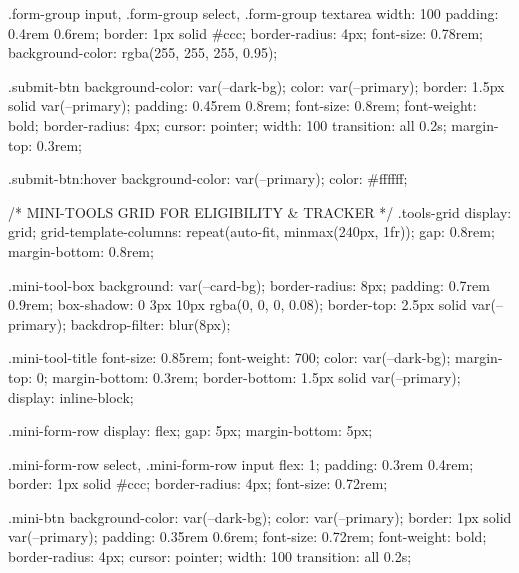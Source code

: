         .form-group input,
        .form-group select,
        .form-group textarea {
            width: 100%
            padding: 0.4rem 0.6rem;
            border: 1px solid #ccc;
            border-radius: 4px;
            font-size: 0.78rem;
            background-color: rgba(255, 255, 255, 0.95);
        }

        .submit-btn {
            background-color: var(--dark-bg);
            color: var(--primary);
            border: 1.5px solid var(--primary);
            padding: 0.45rem 0.8rem;
            font-size: 0.8rem;
            font-weight: bold;
            border-radius: 4px;
            cursor: pointer;
            width: 100%
            transition: all 0.2s;
            margin-top: 0.3rem;
        }

        .submit-btn:hover {
            background-color: var(--primary);
            color: #ffffff;
        }

        /* MINI-TOOLS GRID FOR ELIGIBILITY & TRACKER */
        .tools-grid {
            display: grid;
            grid-template-columns: repeat(auto-fit, minmax(240px, 1fr));
            gap: 0.8rem;
            margin-bottom: 0.8rem;
        }

        .mini-tool-box {
            background: var(--card-bg);
            border-radius: 8px;
            padding: 0.7rem 0.9rem;
            box-shadow: 0 3px 10px rgba(0, 0, 0, 0.08);
            border-top: 2.5px solid var(--primary);
            backdrop-filter: blur(8px);
        }

        .mini-tool-title {
            font-size: 0.85rem;
            font-weight: 700;
            color: var(--dark-bg);
            margin-top: 0;
            margin-bottom: 0.3rem;
            border-bottom: 1.5px solid var(--primary);
            display: inline-block;
        }

        .mini-form-row {
            display: flex;
            gap: 5px;
            margin-bottom: 5px;
        }

        .mini-form-row select,
        .mini-form-row input {
            flex: 1;
            padding: 0.3rem 0.4rem;
            border: 1px solid #ccc;
            border-radius: 4px;
            font-size: 0.72rem;
        }

        .mini-btn {
            background-color: var(--dark-bg);
            color: var(--primary);
            border: 1px solid var(--primary);
            padding: 0.35rem 0.6rem;
            font-size: 0.72rem;
            font-weight: bold;
            border-radius: 4px;
            cursor: pointer;
            width: 100%
            transition: all 0.2s;
        }

